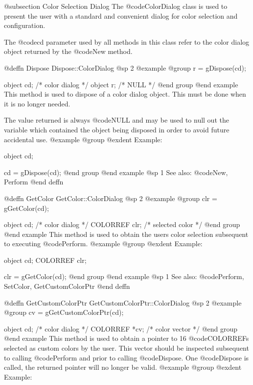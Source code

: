 @subsection Color Selection Dialog
The @code{ColorDialog} class is used to present the user with a standard
and convenient dialog for color selection and configuration.

The @code{cd} parameter used by all methods in this class refer to
the color dialog object returned by the @code{New} method.









@deffn {Dispose} Dispose::ColorDialog
@sp 2
@example
@group
r = gDispose(cd);

object  cd;     /*  color dialog   */
object  r;      /*  NULL           */
@end group
@end example
This method is used to dispose of a color dialog object.  This must
be done when it is no longer needed.

The value returned is always @code{NULL} and may be used to null out
the variable which contained the object being disposed in order to
avoid future accidental use.
@example
@group
@exdent Example:

object  cd;

cd = gDispose(cd);
@end group
@end example
@sp 1
See also:  @code{New, Perform}
@end deffn









@deffn {GetColor} GetColor::ColorDialog
@sp 2
@example
@group
clr = gGetColor(cd);

object   cd;    /*  color dialog    */
COLORREF clr;   /*  selected color  */
@end group
@end example
This method is used to obtain the users color selection subsequent to
executing @code{Perform}.
@example
@group
@exdent Example:

object  cd;
COLORREF clr;

clr = gGetColor(cd);
@end group
@end example
@sp 1
See also:  @code{Perform, SetColor, GetCustomColorPtr}
@end deffn













@deffn {GetCustomColorPtr} GetCustomColorPtr::ColorDialog
@sp 2
@example
@group
cv = gGetCustomColorPtr(cd);

object   cd;    /*  color dialog    */
COLORREF *cv;   /*  color vector    */
@end group
@end example
This method is used to obtain a pointer to 16 @code{COLORREF}s
selected as custom colors by the user.  This vector should be
inspected subsequent to calling @code{Perform} and prior to
calling @code{Dispose}.  One @code{Dispose} is called, the returned
pointer will no longer be valid.
@example
@group
@exdent Example:

